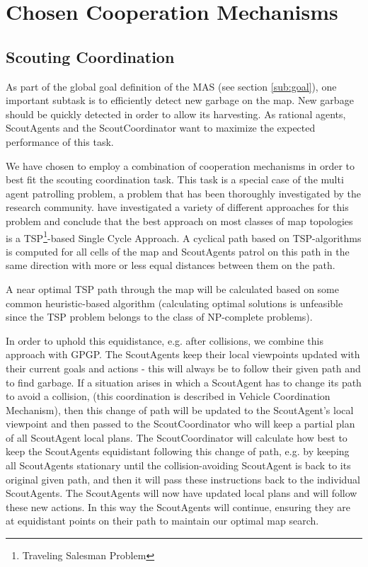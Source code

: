 \section{Chosen Cooperation Mechanisms}
\label{sec:chosCoop}


\subsection{Scouting Coordination}

As part of the global goal definition of the MAS (see section \ref{sub:goal}), one important subtask is to efficiently detect new garbage on the map. New garbage should be quickly detected in order to allow its harvesting. As rational agents, ScoutAgents and the ScoutCoordinator want to maximize the expected performance of this task.

We have chosen to employ a combination of cooperation mechanisms in order to best fit the scouting coordination task. This task is a special case of the multi agent patrolling problem, a problem that has been thoroughly investigated by the research community. \cite{Almeida2004} have investigated a variety of different approaches for this problem and conclude that the best approach on most classes of map topologies is a TSP\footnote{Traveling Salesman Problem}-based Single Cycle Approach. A cyclical path based on TSP-algorithms is computed for all cells of the map and ScoutAgents patrol on this path in the same direction with more or less equal distances between them on the path. 

A near optimal TSP path through the map will be calculated based on some common heuristic-based algorithm (calculating optimal solutions is unfeasible since the TSP problem belongs to the class of NP-complete problems).

In order to uphold this equidistance, e.g. after collisions, we combine this approach with GPGP. The ScoutAgents keep their local viewpoints updated with their current goals and actions - this will always be to follow their given path and to find garbage. If a situation arises in which a ScoutAgent has to change its path to avoid a collision, (this coordination is described in Vehicle Coordination Mechanism), then this change of path will be updated to the ScoutAgent's local viewpoint and then passed to the ScoutCoordinator who will keep a partial plan of all ScoutAgent local plans. The ScoutCoordinator will calculate how best to keep the ScoutAgents equidistant following this change of path, e.g. by keeping all ScoutAgents stationary until the collision-avoiding ScoutAgent is back to its original given path, and then it will pass these instructions back to the individual ScoutAgents. The ScoutAgents will now have updated local plans and will follow these new actions. In this way the ScoutAgents will continue, ensuring they are at equidistant points on their path to maintain our optimal map search. 

